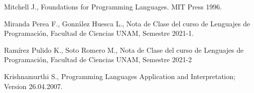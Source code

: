 \documentclass[12pt]{extarticle}
\begin{document}
\begin{thebibliography}{9}


Mitchell J., Foundations for Programming Languages. MIT Press 1996.


Miranda Perea F., González Huesca L., Nota de Clase del curso de Lenguajes de Programación, Facultad de Ciencias UNAM, Semestre 2021-1.

Ramírez Pulido K., Soto Romero M., Nota de Clase del curso de Lenguajes de Programación, Facultad de Ciencias UNAM, Semestre 2021-2



Krishnamurthi S., Programming Languages Application and Interpretation; Version 26.04.2007.


\end{thebibliography}
\end{document}
